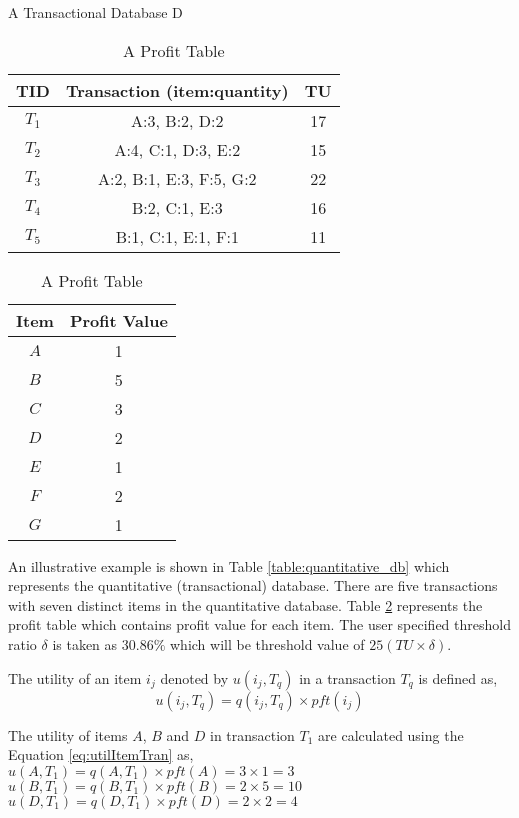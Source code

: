\documentclass[11pt,openright]{report}
\begin{document}
\begin{table}[!t]
	\renewcommand{\arraystretch}{1.3}
	\caption{A Transactional Database D}
	\label{table:quantitative_db}
	\centering
	\begin{tabular}{|c||c||c|}
		\hline
		\bfseries TID & \bfseries Transaction (item:quantity) & \bfseries TU\\
		\hline\hline
		$T_1$ & A:3, B:2, D:2 & 17\\ \hline
		$T_2$ & A:4, C:1, D:3, E:2 & 15\\ \hline
		$T_3$ & A:2, B:1, E:3, F:5, G:2 & 22\\ \hline
		$T_4$ & B:2, C:1, E:3 & 16\\ \hline
		$T_5$ & B:1, C:1, E:1, F:1 & 11\\ \hline
	\end{tabular}
	
	\bigskip
	
	\renewcommand{\arraystretch}{1.3}
	\caption{A Profit Table}
	\label{table:profit_table}
	\centering
	\begin{tabular}{|c||c|}
		\hline
		\bfseries Item & \bfseries Profit Value\\
		\hline\hline
		$A$ & 1\\ \hline
		$B$ & 5 \\ \hline
		$C$ & 3\\ \hline
		$D$ & 2\\ \hline
		$E$ & 1\\ \hline
		$F$ & 2\\ \hline
		$G$ & 1\\ \hline
	\end{tabular}
\end{table}

An illustrative example is shown in Table \ref{table:quantitative_db} which represents the quantitative (transactional) database. There are five transactions with seven distinct items in the quantitative database. Table \ref{table:profit_table} represents the profit table which contains profit value for each item. The user specified threshold ratio $\delta$ is taken as $30.86\%$ which will be threshold value of $25 (TU \times \delta)$.


\begin{definition}
	The utility of an item $i_j$ denoted by $u(i_j, T_q)$ in a transaction $T_q$ is defined as,
	\begin{equation}
	u(i_j, T_q) = q(i_j, T_q) \times pft(i_j)    \label{eq:utilItemTran}
	\end{equation}
\end{definition}
The utility of items $A$, $B$ and $D$ in transaction $T_1$ are calculated using the Equation \ref{eq:utilItemTran} as,\\
\indent $u(A,T_1) = q(A,T_1) \times pft(A) = 3 \times 1 = 3$\\
\indent $u(B,T_1) = q(B,T_1) \times pft(B) = 2 \times 5 = 10$\\
\indent $u(D,T_1) = q(D,T_1) \times pft(D) = 2 \times 2 = 4$
\end{document}
